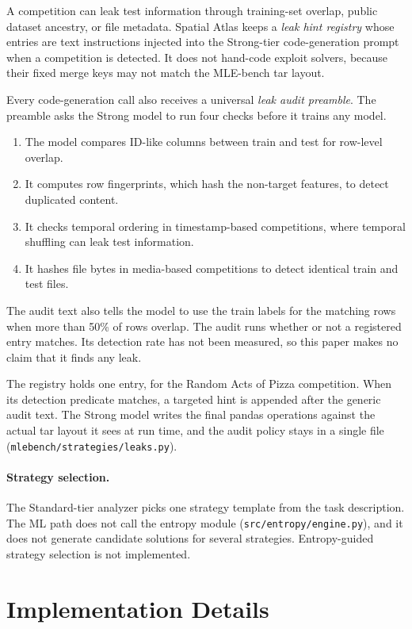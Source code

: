\documentclass{article}
\begin{document}
A competition can leak test information through training-set overlap, public dataset ancestry, or file metadata. Spatial Atlas keeps a \emph{leak hint registry} whose entries are text instructions injected into the Strong-tier code-generation prompt when a competition is detected. It does not hand-code exploit solvers, because their fixed merge keys may not match the MLE-bench tar layout.

Every code-generation call also receives a universal \emph{leak audit preamble}. The preamble asks the Strong model to run four checks before it trains any model.
\begin{enumerate}[leftmargin=*,nosep]
  \item The model compares ID-like columns between train and test for row-level overlap.
  \item It computes row fingerprints, which hash the non-target features, to detect duplicated content.
  \item It checks temporal ordering in timestamp-based competitions, where temporal shuffling can leak test information.
  \item It hashes file bytes in media-based competitions to detect identical train and test files.
\end{enumerate}
The audit text also tells the model to use the train labels for the matching rows when more than 50\% of rows overlap. The audit runs whether or not a registered entry matches. Its detection rate has not been measured, so this paper makes no claim that it finds any leak.

The registry holds one entry, for the Random Acts of Pizza competition. When its detection predicate matches, a targeted hint is appended after the generic audit text. The Strong model writes the final pandas operations against the actual tar layout it sees at run time, and the audit policy stays in a single file (\texttt{mlebench/strategies/leaks.py}).

\paragraph{Strategy selection.}
The Standard-tier analyzer picks one strategy template from the task description. The ML path does not call the entropy module (\texttt{src/entropy/engine.py}), and it does not generate candidate solutions for several strategies. Entropy-guided strategy selection is not implemented.

\section{Implementation Details}
\label{sec:implementation}
\end{document}
